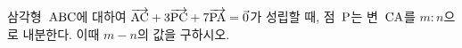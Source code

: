 삼각형~$\mathrm{ABC}$에 대하여 $\overrightarrow{\mathrm{AC}}+3\overrightarrow{\mathrm{PC}}+7\overrightarrow{\mathrm{PA}}=\vec{0}$가 성립할 때, 점~$\mathrm{P}$는 변~$\mathrm{CA}$를 $m:n$으로 내분한다. 이때 $m-n$의 값을 구하시오. 
